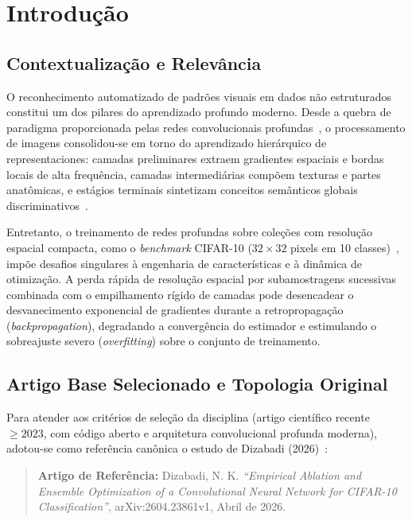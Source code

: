 \documentclass[runningheads]{llncs}
\begin{document}
\section{Introdu\c{c}\~{a}o}
\label{sec:introducao}

\subsection{Contextualiza\c{c}\~{a}o e Relev\^{a}ncia}
O reconhecimento automatizado de padr\~{o}es visuais em dados n\~{a}o estruturados constitui um dos pilares do aprendizado profundo moderno. Desde a quebra de paradigma proporcionada pelas redes convolucionais profundas~\cite{krizhevsky2009learning,simonyan2014very}, o processamento de imagens consolidou-se em torno do aprendizado hier\'{a}rquico de representaciones: camadas preliminares extraem gradientes espaciais e bordas locais de alta frequ\^{e}ncia, camadas intermedi\'{a}rias comp\~{o}em texturas e partes anat\^{o}micas, e est\'{a}gios terminais sintetizam conceitos sem\^{a}nticos globais discriminativos~\cite{goodfellow2016deep}.

Entretanto, o treinamento de redes profundas sobre cole\c{c}\~{o}es com resolu\c{c}\~{a}o espacial compacta, como o \textit{benchmark} CIFAR-10 ($32 \times 32$ pixels em 10 classes)~\cite{krizhevsky2009learning}, imp\~{o}e desafios singulares \`{a} engenharia de caracter\'{i}sticas e \`{a} din\^{a}mica de otimiza\c{c}\~{a}o. A perda r\'{a}pida de resolu\c{c}\~{a}o espacial por subamostragens sucessivas combinada com o empilhamento r\'{i}gido de camadas pode desencadear o desvanecimento exponencial de gradientes durante a retropropaga\c{c}\~{a}o (\textit{backpropagation}), degradando a converg\^{e}ncia do estimador e estimulando o sobreajuste severo (\textit{overfitting}) sobre o conjunto de treinamento.

\subsection{Artigo Base Selecionado e Topologia Original}
Para atender aos crit\'{e}rios de sele\c{c}\~{a}o da disciplina (artigo cient\'{i}fico recente $\ge 2023$, com c\'{o}digo aberto e arquitetura convolucional profunda moderna), adotou-se como refer\^{e}ncia can\^{o}nica o estudo de Dizabadi (2026)~\cite{dizabadi2026empirical}:
\begin{quote}
    \textbf{Artigo de Refer\^{e}ncia:} Dizabadi, N. K. \textit{``Empirical Ablation and Ensemble Optimization of a Convolutional Neural Network for CIFAR-10 Classification''}, arXiv:2604.23861v1, Abril de 2026.
\end{quote}
\end{document}
